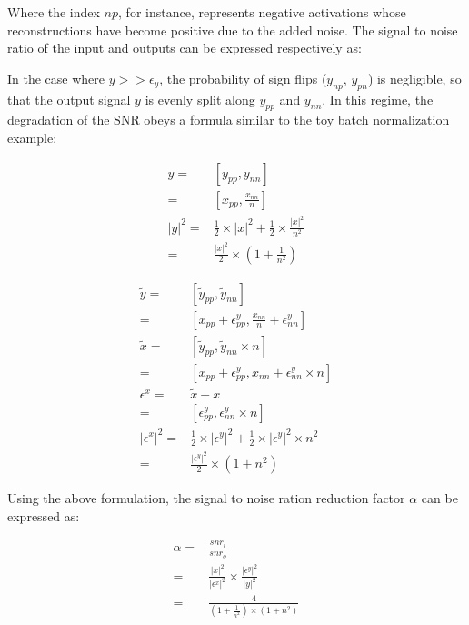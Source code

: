 \documentclass[twocolumn]{bmcart}
\begin{document}
Where the index $np$, for instance, represents negative activations whose reconstructions have become positive due to the added noise. 
The signal to noise ratio of the input and outputs can be expressed respectively as:

In the case where $y >> \epsilon_y$, the probability of sign flips ($y_{np}$, $y_{pn}$) is negligible, 
so that the output signal $y$ is evenly split along $y_{pp}$ and $y_{nn}$.
In this regime, the degradation of the SNR obeys a formula similar to the toy batch normalization example:

\begin{subequations}
\begin{align}
 y =& [y_{pp}, y_{nn}] \\
   =& [x_{pp}, \frac{x_{nn}}{n}] \\
 |y|^2 =& \frac{1}{2} \times |x|^2 + \frac{1}{2} \times \frac{|x|^2}{n^2} \\
       =&\frac{|x|^2}{2} \times (1+\frac{1}{n^2})
\end{align}
\end{subequations}

\begin{subequations}
\begin{align}
\tilde{y}       =& [ \tilde{y}_{pp}, \tilde{y}_{nn}] \\
                =& [ x_{pp} + \epsilon_{pp}^y, \frac{x_{nn}}{n} + \epsilon_{nn}^y ] \\
\tilde{x}       =& [ \tilde{y}_{pp}, \tilde{y}_{nn} \times n] \\
                =& [ x_{pp} + \epsilon_{pp}^y, x_{nn} + \epsilon_{nn}^y \times n  ]\\
\epsilon^x      =& \tilde{x} - x\\
                =& [ \epsilon_{pp}^y, \epsilon_{nn}^y \times n ]\\
|\epsilon^x|^2  =& \frac{1}{2} \times |\epsilon^y|^2 + \frac{1}{2} \times |\epsilon^y|^2 \times n^2 \\
                =& \frac{|\epsilon^y|^2}{2} \times (1 + n^2)
\end{align}
\end{subequations}

Using the above formulation, the signal to noise ration reduction factor $\alpha$ can be expressed as:

\begin{subequations}
\begin{align}
\alpha =& \frac{snr_i}{snr_o} \\
       =& \frac{|x|^2}{|\epsilon^x|^2} \times  \frac{|\epsilon^y|^2}{|y|^2} \\
       =& \frac{4}{(1+\frac{1}{n^2}) \times (1 + n^2)}
\end{align}
\end{subequations}
\end{document}
